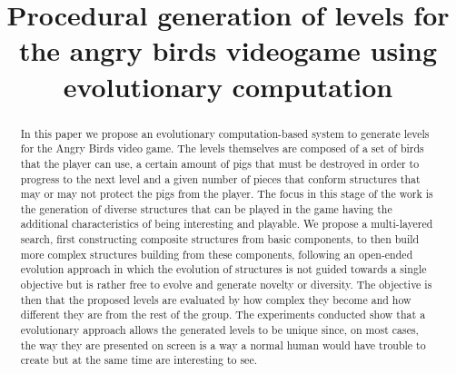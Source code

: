 \documentclass[conference]{IEEEtran}
\begin{document}
\title{Procedural generation of levels for the angry birds videogame using
evolutionary computation\\
}

\author{
\and
{} 
\and
{} }

\maketitle


\begin{abstract}
    In this paper we propose an evolutionary computation-based system to generate 
    levels for the Angry Birds video game. The levels themselves are composed of a 
    set of birds that the player can use, a certain amount of pigs that must be destroyed 
    in order to progress to the next level and a given number of pieces that conform 
    structures that may or may not protect the pigs from the player. The focus in this stage of the work
    is the generation of diverse structures that can be played in the game having the
    additional characteristics of being interesting and playable. We propose a 
    multi-layered search, first constructing composite structures from basic components, to then
    build more complex structures building from these components, following an open-ended 
    evolution approach in which the evolution of structures is not guided towards 
    a single objective but is rather free to evolve and generate novelty or diversity. 
    The objective is then that the proposed levels are evaluated by how complex they become and how 
    different they are from the rest of the group. The experiments conducted show that a evolutionary approach allows the generated levels
    to be unique since, on most cases, the way they are presented on screen
    is a way a normal human would have trouble to create but at the same time are interesting to see.
    \end{abstract}
    
\end{document}
